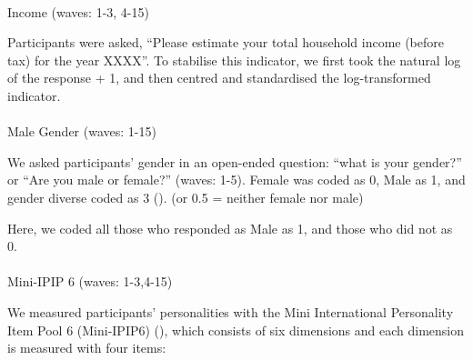\documentclass[
  single column]{article}
\makeatletter
\let\oldparagraph\paragraph
\renewcommand{\paragraph}{
    \@ifstar
      \xxxParagraphStar
      \xxxParagraphNoStar
  }
\newcommand{\xxxParagraphStar}[1]{\oldparagraph*{#1}\mbox{}}
\newcommand{\xxxParagraphNoStar}[1]{\oldparagraph{#1}\mbox{}}
\makeatother
\begin{document}
\paragraph{Income (waves: 1-3, 4-15)}\label{income-waves-1-3-4-15}

Participants were asked, ``Please estimate your total household income
(before tax) for the year XXXX''. To stabilise this indicator, we first
took the natural log of the response + 1, and then centred and
standardised the log-transformed indicator.

\paragraph{Male Gender (waves: 1-15)}\label{male-gender-waves-1-15}

We asked participants' gender in an open-ended question: ``what is your
gender?'' or ``Are you male or female?'' (waves: 1-5). Female was coded
as 0, Male as 1, and gender diverse coded as 3
(). (or 0.5
= neither female nor male)

Here, we coded all those who responded as Male as 1, and those who did
not as 0.

\paragraph{Mini-IPIP 6 (waves:
1-3,4-15)}\label{mini-ipip-6-waves-1-34-15}

We measured participants' personalities with the Mini International
Personality Item Pool 6 (Mini-IPIP6) (), which consists of six dimensions and each
dimension is measured with four items:
\end{document}

